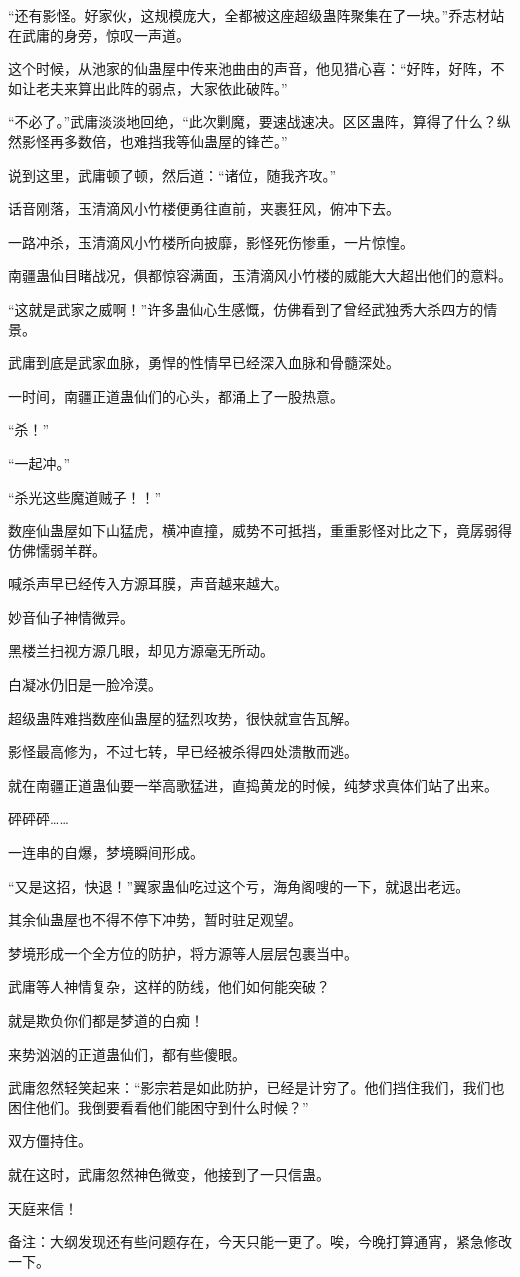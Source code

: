 \begin{this_body}
“还有影怪。好家伙，这规模庞大，全都被这座超级蛊阵聚集在了一块。”乔志材站在武庸的身旁，惊叹一声道。

这个时候，从池家的仙蛊屋中传来池曲由的声音，他见猎心喜：“好阵，好阵，不如让老夫来算出此阵的弱点，大家依此破阵。”

“不必了。”武庸淡淡地回绝，“此次剿魔，要速战速决。区区蛊阵，算得了什么？纵然影怪再多数倍，也难挡我等仙蛊屋的锋芒。”

说到这里，武庸顿了顿，然后道：“诸位，随我齐攻。”

话音刚落，玉清滴风小竹楼便勇往直前，夹裹狂风，俯冲下去。

一路冲杀，玉清滴风小竹楼所向披靡，影怪死伤惨重，一片惊惶。

南疆蛊仙目睹战况，俱都惊容满面，玉清滴风小竹楼的威能大大超出他们的意料。

“这就是武家之威啊！”许多蛊仙心生感慨，仿佛看到了曾经武独秀大杀四方的情景。

武庸到底是武家血脉，勇悍的性情早已经深入血脉和骨髓深处。

一时间，南疆正道蛊仙们的心头，都涌上了一股热意。

“杀！”

“一起冲。”

“杀光这些魔道贼子！！”

数座仙蛊屋如下山猛虎，横冲直撞，威势不可抵挡，重重影怪对比之下，竟孱弱得仿佛懦弱羊群。

喊杀声早已经传入方源耳膜，声音越来越大。

妙音仙子神情微异。

黑楼兰扫视方源几眼，却见方源毫无所动。

白凝冰仍旧是一脸冷漠。

超级蛊阵难挡数座仙蛊屋的猛烈攻势，很快就宣告瓦解。

影怪最高修为，不过七转，早已经被杀得四处溃散而逃。

就在南疆正道蛊仙要一举高歌猛进，直捣黄龙的时候，纯梦求真体们站了出来。

砰砰砰……

一连串的自爆，梦境瞬间形成。

“又是这招，快退！”翼家蛊仙吃过这个亏，海角阁嗖的一下，就退出老远。

其余仙蛊屋也不得不停下冲势，暂时驻足观望。

梦境形成一个全方位的防护，将方源等人层层包裹当中。

武庸等人神情复杂，这样的防线，他们如何能突破？

就是欺负你们都是梦道的白痴！

来势汹汹的正道蛊仙们，都有些傻眼。

武庸忽然轻笑起来：“影宗若是如此防护，已经是计穷了。他们挡住我们，我们也困住他们。我倒要看看他们能困守到什么时候？”

双方僵持住。

就在这时，武庸忽然神色微变，他接到了一只信蛊。

天庭来信！

备注：大纲发现还有些问题存在，今天只能一更了。唉，今晚打算通宵，紧急修改一下。

\end{this_body}

